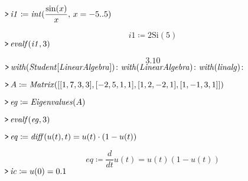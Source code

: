 \documentclass{article}
\begin{document}
\lstset{basicstyle=\ttfamily,breaklines=true,columns=flexible}
\pagestyle{empty}
\mapleinput
{$ \displaystyle \texttt{>\,} \mathit{i1} \coloneqq \mathit{int} (\frac{\sin (x)}{x},\,x =-5..5)\, $}

\begin{dmath}\label{(1)}
\mathit{i1} \coloneqq 2 \mathrm{Si}\! \left(5\right)
\end{dmath}
\mapleinput
{$ \displaystyle \texttt{>\,} \mathit{evalf} (\mathit{i1} ,3) $}

\begin{dmath}\label{(2)}
 3.10
\end{dmath}
\mapleinput
{$ \displaystyle \texttt{>\,} \mathit{with} (\mathit{Student} [\mathit{LinearAlgebra}])\colon \mathit{with} (\mathit{LinearAlgebra})\colon \mathit{with} (\mathit{linalg})\colon  $}

\mapleinput
{$ \displaystyle \texttt{>\,} A \coloneqq \mathit{Matrix} ([[1,7,3,3],[-2,5,1,1],[1,2,-2,1],[1,-1,3,1]]) $}

\mapleinput
{$ \displaystyle \texttt{>\,} \mathit{eg} \coloneqq \mathit{Eigenvalues} (A) $}

\mapleinput
{$ \displaystyle \texttt{>\,} \mathit{evalf} (\mathit{eg} ,3) $}

\mapleinput
{$ \displaystyle \texttt{>\,} \mathit{eq} \coloneqq \mathit{diff} (u (t),t)=u (t)\cdot (1-u (t)) $}

\begin{dmath}\label{(6)}
\mathit{eq} \coloneqq \frac{d}{d t}u \! \left(t \right)=u \! \left(t \right) \left(1-u \! \left(t \right)\right)
\end{dmath}
\mapleinput
{$ \displaystyle \texttt{>\,} \mathit{ic} \coloneqq u (0)= 0.1 $}
\end{document}
